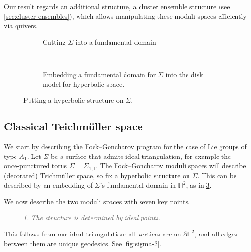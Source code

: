 \documentclass{amsart}
\theoremstyle{plain}
\theoremstyle{definition}
\theoremstyle{remark}
\begin{document}
  Our result regards an additional structure, a cluster ensemble
  structure (see \cref{sec:cluster-ensembles}), which allows
  manipulating these moduli spaces efficiently via quivers.

  \begin{figure}[h]
    \centering
    \begin{subfigure}[t]{0.40\textwidth}
      \centering
      
      \caption{Cutting $\Sigma$ into a fundamental domain.
        \label{fig:sigma-1}
      }
    \end{subfigure}
    ~ \hspace{0.05\textwidth} ~
    \begin{subfigure}[t]{0.40\textwidth}
      \centering 

      \caption{Embedding a fundamental domain for $\Sigma$ into the disk
        model for hyperbolic space.
        \label{fig:sigma-2}
      }
    \end{subfigure}
    \caption{Putting a hyperbolic structure on $\Sigma$.
      \label{fig:rho-by-fundamental-domain}
    }
  \end{figure}

  \subsection{Classical Teichmüller space}

  We start by describing the Fock--Goncharov program for the case of Lie
  groups of type $A_1$. Let $\Sigma$ be a surface that admits ideal
  triangulation, for example the once-punctured torus $\Sigma =
  \Sigma_{1,1}$. The Fock--Goncharov moduli spaces will describe
  (decorated) Teichmüller space, so fix a hyperbolic structure on
  $\Sigma$. This can be described by an embedding of $\Sigma$'s
  fundamental domain in $\mathbb{H}^2$, as in
  \cref{fig:rho-by-fundamental-domain}.

  We now describe the two moduli spaces with seven key points.

  \begin{quote}
    \emph{1. The structure is determined by ideal points.}
  \end{quote}

  This follows from our ideal triangulation: all vertices are on
  $\partial \mathbb{H}^2$, and all edges between them are unique
  geodesics. See \cref{fig:sigma-3}.
\end{document}
